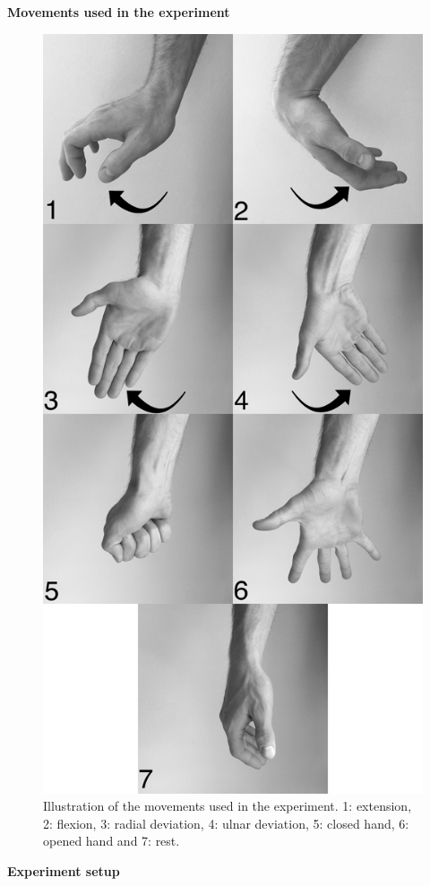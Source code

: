 \newpage
\textbf{\Large Movements used in the experiment}

\begin{figure}[H]                 
	\includegraphics[width=.6\textwidth]{figures/handGestures/BW/allHandMovementsVerticalBW}  
	\caption{Illustration of the movements used in the experiment. 1: extension, 2: flexion, 3: radial deviation, 4: ulnar deviation, 5: closed hand, 6: opened hand and 7: rest.}
	\label{fig:experiment_movements} 
\end{figure}

\newpage
\textbf{\Large Experiment setup}

